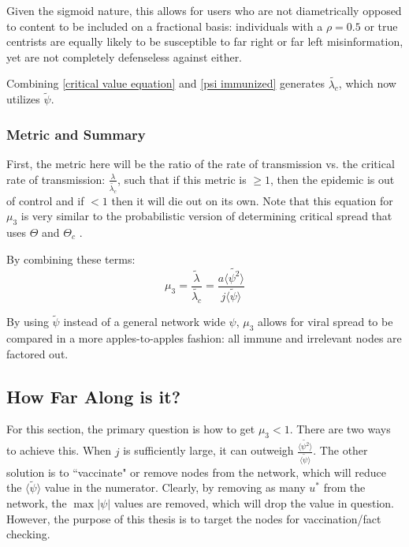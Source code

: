 \documentclass[preprint,review,12pt]{elsarticle}
\begin{document}
Given the sigmoid nature, this allows for users who are not diametrically opposed to content to be included on a fractional basis: individuals with a $\rho = 0.5$ or true centrists are equally likely to be susceptible to far right or far left misinformation, yet are not completely defenseless against either.

Combining \ref{critical value equation} and \ref{psi immunized} generates $\tilde{\lambda_c}$, which now utilizes $\tilde{\psi}$.

\subsubsection{Metric and Summary}
First, the metric here will be the ratio of the rate of transmission vs. the critical rate of transmission: $\frac{\lambda}{\tilde{\lambda_c}}$, such that if this metric is $\geq 1$, then the epidemic is out of control and if $< 1$ then it will die out on its own. Note that this equation for $\mu_3$ is very similar to the probabilistic version of determining critical spread that uses $\Theta$ and $\Theta_c$ \cite{newman2005threshold,ferrari2006network,meyers2005network,callaway2000network,newman2002random}.

By combining these terms:
\begin{equation}
\label{mu_3 equation}
    \mu_3 = \frac{\tilde{\lambda}}{\tilde{\lambda_c}} = \frac{a \langle \tilde{\psi^2} \rangle}{j\langle \tilde{\psi} \rangle}
\end{equation}

By using $\tilde{\psi}$ instead of a general network wide $\psi$, $\mu_3$ allows for viral spread to be compared in a more apples-to-apples fashion: all immune and irrelevant nodes are factored out. 


\subsection{How Far Along is it?}
For this section, the primary question is how to get $\mu_3 < 1$. There are two ways to achieve this. When $j$ is sufficiently large, it can outweigh $\frac{\langle \tilde{\psi^2} \rangle}{\langle \tilde{\psi} \rangle}$. The other solution is to ``vaccinate" or remove nodes from the network, which will reduce the $\langle \tilde{\psi} \rangle$ value in the numerator. Clearly, by removing as many $u^*$ from the network, the $\max |\psi|$ values are removed, which will drop the value in question. However, the purpose of this thesis is to target the nodes for vaccination/fact checking. 
\end{document}
